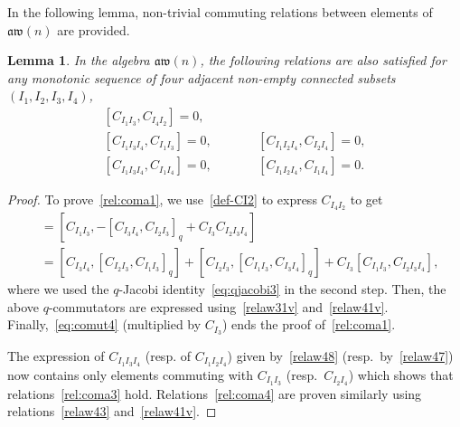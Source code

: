 \documentclass[10pt,a4paper]{amsart}
\numberwithin{equation}{section}
\newtheorem{lemm}[theo]{Lemma}
\theoremstyle{definition}
\newcommand{\aw}{\mathfrak{aw}(n)}
\begin{document}
In the following lemma, non-trivial commuting relations between elements of $\aw$ are provided.
\begin{lemm}\label{lemm:relcom2}
In the algebra $\aw$, the following relations are also satisfied for any monotonic sequence of four adjacent non-empty connected subsets $(I_1,I_2,I_3,I_4)$,
\begin{subequations}%
\begin{alignat}{3}
 & [C_{I_1I_3}, C_{I_4I_2} ]=0 ,&&& \label{rel:coma1}\\
 & [C_{I_1I_3I_4}, C_{I_1I_3}]=0 , \qquad&& [C_{I_1I_2I_4}, C_{I_2I_4}]=0 , &\label{rel:coma3}\\
 & [C_{I_1I_3I_4}, C_{I_1I_4}]=0 , \qquad&& [C_{I_1I_2I_4}, C_{I_1I_4}]=0.&\label{rel:coma4}
\end{alignat}
\end{subequations}
\end{lemm}

\begin{proof}
To prove~\eqref{rel:coma1}, we use~\eqref{def-CI2} to express $C_{I_4I_2}$ to get
\begin{align*}
[C_{I_1I_3}, C_{I_4I_2} ]&= [C_{I_1I_3}, -[C_{I_3I_4},C_{I_2I_3}]_q +C_{I_3}C_{I_2I_3I_4}]
\\
&= [C_{I_3I_4}, [C_{I_2I_3},C_{I_1I_3}]_q] + [C_{I_2I_3}, [C_{I_1I_3},C_{I_3I_4}]_q] +C_{I_3}[C_{I_1I_3},C_{I_2I_3I_4}],
\end{align*}
where we used the $q$-Jacobi identity~\eqref{eq:qjacobi3} in the second step. Then, the above $q$-commutators are expressed using~\eqref{relaw31v} and~\eqref{relaw41v}.
Finally,~\eqref{eq:comut4} (multiplied by $C_{I_3}$) ends the proof of~\eqref{rel:coma1}.

The expression of $C_{I_1I_3I_4}$ (resp. of $C_{I_1I_2I_4}$) given by~\eqref{relaw48} (resp.\ by~\eqref{relaw47}) now contains only elements commuting with $C_{I_1I_3}$ (resp.\ $C_{I_2I_4}$)
which shows that relations~\eqref{rel:coma3} hold. Relations~\eqref{rel:coma4} are proven similarly using relations~\eqref{relaw43} and~\eqref{relaw41v}.
\end{proof}
\end{document}
